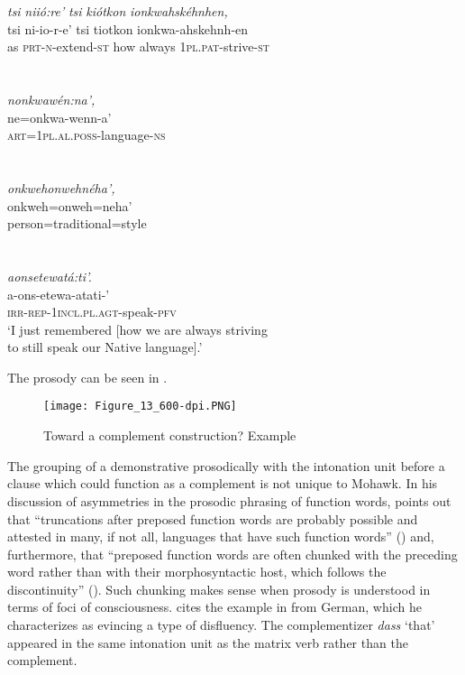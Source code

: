 \documentclass[output=paper]{langscibook}
\begin{document}
  \glll  \textit{tsi}  \textit{niió:re’}          \textit{tsi}    \textit{kiótkon}    \textit{ionkwahskéhnhen,}\\
    tsi  ni-io-r-e’        tsi    tiotkon    ionkwa-ahskehnh-en\\
    as    \textsc{prt-n-}extend-\textsc{st}  how    always    \textsc{1pl.pat}{}-strive-\textsc{st}\\~\\~\\

 \glll   \textit{nonkwawén:na’,}\\
    ne=onkwa-wenn-a’\\
    \textsc{art=1pl.al.poss}{}-language-\textsc{ns}\\~\\~\\
    
\glll    \textit{onkwehonwehnéha’,}\\
    onkweh=onweh=neha’\\
    person=traditional=style\\~\\~\\

\glll    \textit{aonsetewatá:ti’.}\\
    a-ons-etewa-atati-’\\
    \textsc{irr-rep-1incl.pl.agt}{}-speak-\textsc{pfv}\\

\glt    ‘I just remembered [how we are always striving\\
        to still speak our Native language].’

\z

The prosody can be seen in .


\begin{figure}
\texttt{[image: Figure\_13\_600-dpi.PNG]}
\caption{Toward a complement construction? Example }
\label{fig:mithun:13}
\end{figure}

The grouping of a demonstrative prosodically with the intonation unit before a clause which could function as a complement is not unique to Mohawk. In his discussion of asymmetries in the prosodic phrasing of function words, \citeauthor{Himmelmann2014} points out that “truncations after preposed function words are probably possible and attested in many, if not all, languages that have such function words” (\citeyear[936]{Himmelmann2014}) and, furthermore, that “preposed function words are often chunked with the preceding word rather than with their morphosyntactic host, which follows the discontinuity” (\citeyear[937]{Himmelmann2014}). Such chunking makes sense when prosody is understood in terms of foci of consciousness. \citeauthor{Himmelmann2014} cites the example in  from German, which he characterizes as evincing a type of disfluency. The complementizer \textit{dass} ‘that’ appeared in the same intonation unit as the matrix verb rather than the complement.
\end{document}
